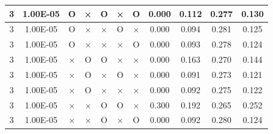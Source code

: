 \documentclass[11pt]{article}
\begin{document}
\begin{longtable}[h]{|r|r|l|l|l|l|l|r|r|l|r|}
\multicolumn{1}{|c|}{3} & \multicolumn{1}{c|}{1.00E-05} & \multicolumn{1}{c|}{O} & \multicolumn{1}{c|}{×} & \multicolumn{1}{c|}{O} & \multicolumn{1}{c|}{×} & \multicolumn{1}{c|}{O} & \multicolumn{1}{c|}{0.000} & \multicolumn{1}{c|}{0.112} & \multicolumn{1}{c|}{0.277} & \multicolumn{1}{c|}{0.130} \\ \hline
\multicolumn{1}{|c|}{3} & \multicolumn{1}{c|}{1.00E-05} & \multicolumn{1}{c|}{O} & \multicolumn{1}{c|}{×} & \multicolumn{1}{c|}{×} & \multicolumn{1}{c|}{O} & \multicolumn{1}{c|}{×} & \multicolumn{1}{c|}{0.000} & \multicolumn{1}{c|}{0.094} & \multicolumn{1}{c|}{0.281} & \multicolumn{1}{c|}{0.125} \\ \hline
\multicolumn{1}{|c|}{3} & \multicolumn{1}{c|}{1.00E-05} & \multicolumn{1}{c|}{O} & \multicolumn{1}{c|}{×} & \multicolumn{1}{c|}{×} & \multicolumn{1}{c|}{×} & \multicolumn{1}{c|}{O} & \multicolumn{1}{c|}{0.000} & \multicolumn{1}{c|}{0.093} & \multicolumn{1}{c|}{0.278} & \multicolumn{1}{c|}{0.124} \\ \hline
\multicolumn{1}{|c|}{3} & \multicolumn{1}{c|}{1.00E-05} & \multicolumn{1}{c|}{×} & \multicolumn{1}{c|}{O} & \multicolumn{1}{c|}{O} & \multicolumn{1}{c|}{×} & \multicolumn{1}{c|}{×} & \multicolumn{1}{c|}{0.000} & \multicolumn{1}{c|}{0.163} & \multicolumn{1}{c|}{0.270} & \multicolumn{1}{c|}{0.144} \\ \hline
\multicolumn{1}{|c|}{3} & \multicolumn{1}{c|}{1.00E-05} & \multicolumn{1}{c|}{×} & \multicolumn{1}{c|}{O} & \multicolumn{1}{c|}{×} & \multicolumn{1}{c|}{O} & \multicolumn{1}{c|}{×} & \multicolumn{1}{c|}{0.000} & \multicolumn{1}{c|}{0.091} & \multicolumn{1}{c|}{0.273} & \multicolumn{1}{c|}{0.121} \\ \hline
\multicolumn{1}{|c|}{3} & \multicolumn{1}{c|}{1.00E-05} & \multicolumn{1}{c|}{×} & \multicolumn{1}{c|}{O} & \multicolumn{1}{c|}{×} & \multicolumn{1}{c|}{×} & \multicolumn{1}{c|}{×} & \multicolumn{1}{c|}{0.000} & \multicolumn{1}{c|}{0.092} & \multicolumn{1}{c|}{0.275} & \multicolumn{1}{c|}{0.122} \\ \hline
\multicolumn{1}{|c|}{3} & \multicolumn{1}{c|}{1.00E-05} & \multicolumn{1}{c|}{×} & \multicolumn{1}{c|}{×} & \multicolumn{1}{c|}{O} & \multicolumn{1}{c|}{O} & \multicolumn{1}{c|}{×} & \multicolumn{1}{c|}{0.300} & \multicolumn{1}{c|}{0.192} & \multicolumn{1}{c|}{0.265} & \multicolumn{1}{c|}{0.252} \\ \hline
\multicolumn{1}{|c|}{3} & \multicolumn{1}{c|}{1.00E-05} & \multicolumn{1}{c|}{×} & \multicolumn{1}{c|}{×} & \multicolumn{1}{c|}{O} & \multicolumn{1}{c|}{×} & \multicolumn{1}{c|}{O} & \multicolumn{1}{c|}{0.000} & \multicolumn{1}{c|}{0.092} & \multicolumn{1}{c|}{0.280} & \multicolumn{1}{c|}{0.124} \\ \hline

\end{longtable}
\end{document}
